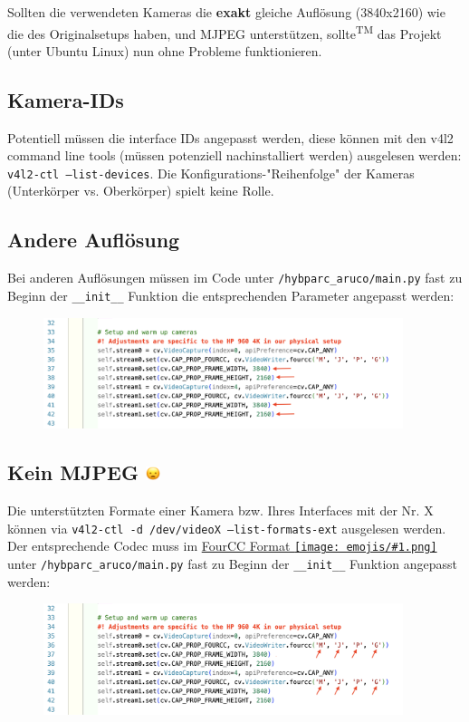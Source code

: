 \documentclass[a4paper, 10pt]{article}
\newcommand{\code}[1]{\texttt{#1}}
\newcommand{\emoji}[1]{
    \begingroup\normalfont
    \texttt{[image: emojis/\#1.png]}
    \endgroup
}
\begin{document}
Sollten die verwendeten Kameras die \textbf{exakt} gleiche Auflösung (3840x2160) wie die des Originalsetups haben, und MJPEG unterstützen, sollte\textsuperscript{\tiny TM} das Projekt (unter Ubuntu Linux) nun ohne Probleme funktionieren. 

\subsection{Kamera-IDs}
\label{ssec:cam-indices}
Potentiell müssen die interface IDs angepasst werden, diese können mit den v4l2 command line tools (müssen potenziell nachinstalliert werden) ausgelesen werden: \code{v4l2-ctl --list-devices}. Die Konfigurations-"Reihenfolge" der Kameras (Unterkörper vs. Oberkörper) spielt keine Rolle.

\subsection{Andere Auflösung}
\label{ssec:custom-resolution}
Bei anderen Auflösungen müssen im Code unter \code{/hybparc\_aruco/main.py} fast zu Beginn der \code{\_\_init\_\_} Funktion die entsprechenden Parameter angepasst werden:
\begin{figure}[h]
    \centering
    \includegraphics[width=10.5cm]{resolution.png}
\end{figure}

\subsection{Kein MJPEG \includegraphics[height=0.75em]{emojis/open-mouth.png}}
\label{ssec:the-mjpeg-problem}
Die unterstützten Formate einer Kamera bzw. Ihres Interfaces mit der Nr. X können via \code{v4l2-ctl -d /dev/videoX --list-formats-ext} ausgelesen werden. Der entsprechende Codec muss im \href{https://fourcc.org/codecs.php}{FourCC Format\emoji{link}} unter \code{/hybparc\_aruco/main.py} fast zu Beginn der \code{\_\_init\_\_} Funktion angepasst werden:
\begin{figure}[h]
    \centering
    \includegraphics[width=10.5cm]{fourcc.png}
\end{figure}
\end{document}
